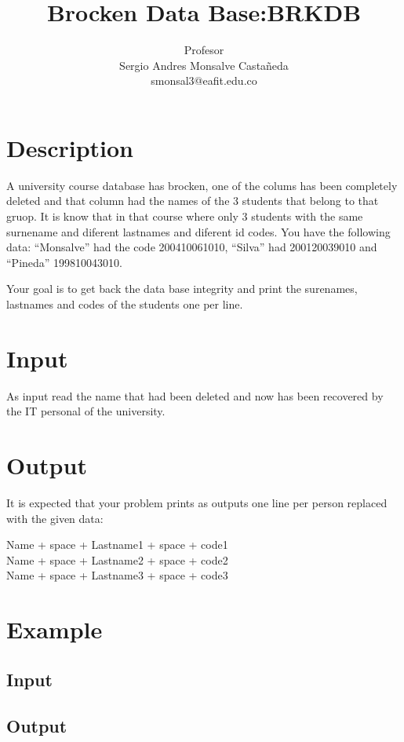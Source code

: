 \documentclass[11pt,letterpaper]{article}
\title{Brocken Data Base:BRKDB}
\author{
	Profesor\\
	Sergio Andres Monsalve Castañeda\\
	smonsal3@eafit.edu.co
}
\begin{document}
 
\pagestyle{fancyplain}
\fancyhf{}
\headheight=20pt %
\renewcommand{\headrulewidth}{0pt} %


\fancyfoot[c]{\thepage}

\maketitle

\begin{minipage}{3cm}
\end{minipage}


\section{Description}

A university course database has brocken, one of the colums has been completely deleted and that column had the names of the 3 students that belong to that gruop. It is know that in that course where only 3 students with the same surnename and diferent lastnames and diferent id codes.
You have the following data: ``Monsalve'' had the code 200410061010, ``Silva'' had 200120039010 and ``Pineda'' 199810043010.

Your goal is to get back the data base integrity and print the surenames, lastnames and codes of the students one per line. 


\section{Input}

As input read the name that had been deleted and now has been recovered by the IT personal of the university.

\section{Output}

It is expected that your problem prints as outputs one line per person replaced with the given data:

Name + space +  Lastname1 + space + code1 \\
Name + space +  Lastname2 + space + code2 \\
Name + space +  Lastname3 + space + code3 \\

\section{Example}
\subsection{Input}

\subsection{Output}


%
%
\end{document}
